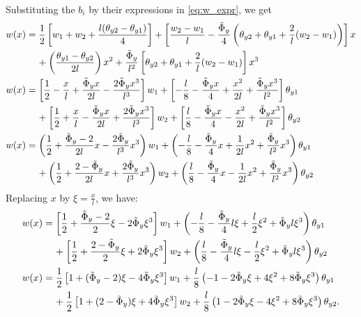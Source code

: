 \documentclass[a4paper,11pt]{article}
\begin{document}
\noindent Substituting the $b_i$ by their expressions in \eqref{eq:w_expr}, we get
\begin{align*}
w(x) & = \frac{1}{2} \left[ w_1 + w_2 + \frac{ l (\theta_{y2} - \theta_{y1}) }{4} \right] + \left[ \frac{w_2 - w_1}{l} - \frac{\tilde{\Phi}_y}{4} \left( \theta_{y2} + \theta_{y1} + \frac{2}{l}(w_2-w_1) \right) \right] x \\
	 & \text{\hspace{4mm}} + \left( \frac{\theta_{y1} - \theta_{y2}}{2l} \right) x^2 + \frac{\tilde{\Phi}_y}{l^2} \left[ \theta_{y2} + \theta_{y1} + \frac{2}{l}(w_2-w_1) \right] x^3 \\
w(x) & = \left[ \frac{1}{2} - \frac{x}{l} + \frac{\tilde{\Phi}_y x}{2l} - \frac{2\tilde{\Phi}_y x^3}{l^3} \right] w_1 + \left[ -\frac{l}{8} - \frac{\tilde{\Phi}_y x}{4} + \frac{x^2}{2l} + \frac{\tilde{\Phi}_y x^3}{l^2} \right] \theta_{y1} \\
	 & \text{\hspace{4mm}} + \left[ \frac{1}{2} + \frac{x}{l} - \frac{\tilde{\Phi}_y x}{2l} + \frac{2\tilde{\Phi}_y x^3}{l^3} \right] w_2 + \left[ \frac{l}{8} - \frac{\tilde{\Phi}_y x}{4} - \frac{x^2}{2l} + \frac{\tilde{\Phi}_y x^3}{l^2} \right] \theta_{y2} \\
w(x) & = \left( \frac{1}{2} + \frac{\tilde{\Phi}_y - 2}{2l} x - \frac{2\tilde{\Phi}_y}{l^3} x^3 \right) w_1 + \left( -\frac{l}{8} - \frac{\tilde{\Phi}_y}{4} x + \frac{1}{2l} x^2 + \frac{\tilde{\Phi}_y}{l^2} x^3 \right) \theta_{y1} \\
	 & \text{\hspace{4mm}} + \left( \frac{1}{2} + \frac{2 - \tilde{\Phi}_y }{2l} x + \frac{2\tilde{\Phi}_y}{l^3} x^3 \right) w_2 + \left( \frac{l}{8} - \frac{\tilde{\Phi}_y}{4} x - \frac{1}{2l} x^2 + \frac{\tilde{\Phi}_y}{l^2} x^3 \right) \theta_{y2} 
\end{align*}
Replacing $x$ by $\xi = \frac{x}{l}$, we have:
\begin{align}
w(x) & = \left[ \frac{1}{2} + \frac{\tilde{\Phi}_y - 2}{2} \xi - 2\tilde{\Phi}_y \xi^3 \right] w_1 + \left( -\frac{l}{8} - \frac{\tilde{\Phi}_y}{4} l\xi + \frac{l}{2} \xi^2 + \tilde{\Phi}_y l\xi^3 \right) \theta_{y1} \nonumber \\
	 & \text{\hspace{4mm}} + \left[ \frac{1}{2} + \frac{2 - \tilde{\Phi}_y}{2}  \xi + 2\tilde{\Phi}_y \xi^3 \right] w_2 + \left( \frac{l}{8} - \frac{\tilde{\Phi}_y}{4} l\xi - \frac{l}{2} \xi^2 + \tilde{\Phi}_y l\xi^3 \right) \theta_{y2} \nonumber \\
w(x) & = \frac{1}{2} \left[ 1 + (\tilde{\Phi}_y - 2) \xi - 4\tilde{\Phi}_y \xi^3 \right] w_1 + \frac{l}{8} \left( -1 - 2\tilde{\Phi}_y \xi + 4 \xi^2 + 8\tilde{\Phi}_y \xi^3 \right) \theta_{y1} \nonumber \\
	 & \text{\hspace{4mm}} + \frac{1}{2} \left[ 1 + (2 - \tilde{\Phi}_y) \xi + 4\tilde{\Phi}_y \xi^3 \right] w_2 + \frac{l}{8} \left( 1 - 2\tilde{\Phi}_y \xi - 4 \xi^2 + 8\tilde{\Phi}_y \xi^3 \right) \theta_{y2}.
\end{align}
\end{document}
